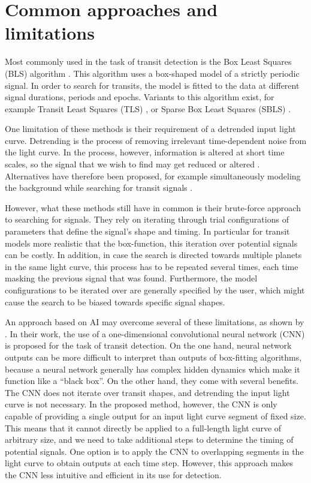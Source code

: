 
\section{Common approaches and limitations}
\label{sec:approaches}

Most commonly used in the task of transit detection is the Box Least Squares (BLS) algorithm \citep{kovacs2002box}. This algorithm uses a box-shaped model of a strictly periodic signal. In order to search for transits, the model is fitted to the data at different signal durations, periods and epochs. Variants to this algorithm exist, for example Transit Least Squares (TLS) \citep{hippke2019optimized}, or Sparse Box Least Squares (SBLS) \citep{panahi2021sparse}.

One limitation of these methods is their requirement of a detrended input light curve. Detrending is the process of removing irrelevant time-dependent noise from the light curve. In the process, however, information is altered at short time scales, so the signal that we wish to find may get reduced or altered \citep{hippke2019wotan}.  Alternatives have therefore been proposed, for example simultaneously modeling the background while searching for transit signals \cite{foreman2015systematic}.

However, what these methods still have in common is their brute-force approach to searching for signals. 
They rely on iterating through trial configurations of parameters that define the signal's shape and timing. In particular for transit models more realistic that the box-function, this iteration over potential signals can be costly. In addition, in case the search is directed towards multiple planets in the same light curve, this process has to be repeated several times, each time masking the previous signal that was found. Furthermore, the model configurations to be iterated over are generally specified by the user, which might cause the search to be biased towards specific signal shapes.

An approach based on AI may overcome several of these limitations, as shown by \cite{pearson2018searching}. In their work, the use of a one-dimensional convolutional neural network (CNN) is proposed for the task of transit detection. On the one hand, neural network outputs can be more difficult to interpret than outputs of box-fitting algorithms, because a neural network generally has complex hidden dynamics which make it function like a ``black box''. On the other hand, they come with several benefits. The CNN does not iterate over transit shapes, and detrending the input light curve is not necessary. 
In the proposed method, however, the CNN is only capable of providing a single output for an input light curve segment of fixed size. 
This means that it cannot directly be applied to a full-length light curve of arbitrary size, and we need to take additional steps to determine the timing of potential signals. One option is to apply the CNN to overlapping segments in the light curve to obtain outputs at each time step. However, this approach makes the CNN less intuitive and efficient in its use for detection. 

